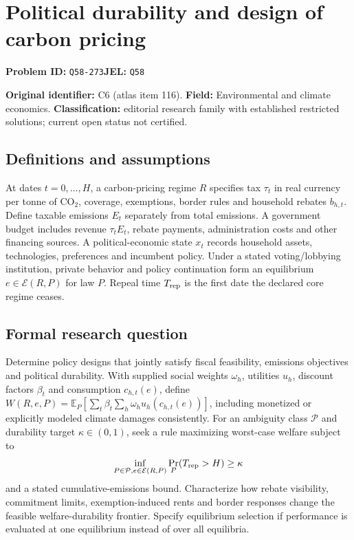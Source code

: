 \documentclass[11pt,a4paper]{article}
\begin{document}
\section*{Political durability and design of carbon pricing}
\textbf{Problem ID:} \texttt{Q58-273}\quad \textbf{JEL:} \texttt{Q58}\par
\label{problem:OP-0116}
\label{atlas:prob:C6}

\noindent\textbf{Original identifier:} C6 (atlas item 116). \textbf{Field:} Environmental and climate economics. \textbf{Classification:} editorial research family with established restricted solutions; current open status not certified.

\subsection*{Definitions and assumptions}

At dates $t=0,\ldots,H$, a carbon-pricing regime $R$ specifies tax $\tau_t$ in real currency per tonne of $\mathrm{CO}_2$, coverage, exemptions, border rules and household rebates $b_{h,t}$. Define taxable emissions $E_t$ separately from total emissions. A government budget includes revenue $\tau_tE_t$, rebate payments, administration costs and other financing sources. A political-economic state $x_t$ records household assets, technologies, preferences and incumbent policy. Under a stated voting/lobbying institution, private behavior and policy continuation form an equilibrium $e\in\mathcal E(R,P)$ for law $P$. Repeal time $T_{\rm rep}$ is the first date the declared core regime ceases.

\subsection*{Formal research question}

Determine policy designs that jointly satisfy fiscal feasibility, emissions objectives and political durability. With supplied social weights $\omega_h$, utilities $u_h$, discount factors $\beta_t$ and consumption $c_{h,t}(e)$, define $W(R,e,P)=\mathbb E_P[\sum_t\beta_t\sum_h\omega_hu_h(c_{h,t}(e))]$, including monetized or explicitly modeled climate damages consistently. For an ambiguity class $\mathcal P$ and durability target $\kappa\in(0,1)$, seek a rule maximizing worst-case welfare subject to
\[
\inf_{P\in\mathcal P,e\in\mathcal E(R,P)}
\Pr_P(T_{\rm rep}>H)\ge\kappa
\]
and a stated cumulative-emissions bound. Characterize how rebate visibility, commitment limits, exemption-induced rents and border responses change the feasible welfare-durability frontier. Specify equilibrium selection if performance is evaluated at one equilibrium instead of over all equilibria.
\end{document}
